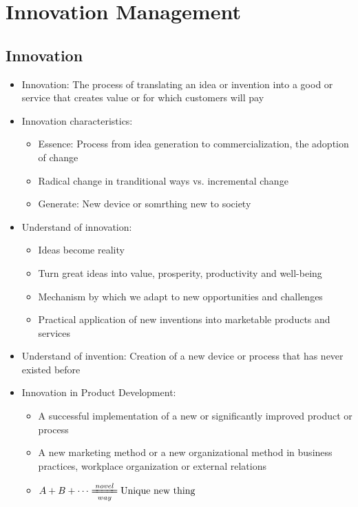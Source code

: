 \documentclass[openany,12pt,a4paper]{book}
\begin{document}
\chapter{Innovation Management}
\section{Innovation}
\begin{itemize}
    \item Innovation: The process of translating an idea or invention into a good or service that creates value or for which customers will pay
    \item Innovation characteristics:
    \begin{itemize}
        \item Essence: Process from idea generation to commercialization, the adoption of change
        \item Radical change in tranditional ways vs. incremental change
        \item Generate: New device or somrthing new to society
    \end{itemize}
    \item Understand of innovation:
    \begin{itemize}
        \item Ideas become reality
        \item Turn great ideas into value, prosperity, productivity and well-being
        \item Mechanism by which we adapt to new opportunities and challenges
        \item Practical application of new inventions into marketable products and services
    \end{itemize}
    \item Understand of invention: Creation of a new device or process that has never existed before
    \item Innovation in Product Development:
    \begin{itemize}
        \item A successful implementation of a new or significantly improved product or process
        \item A new marketing method or a new organizational method in business practices, workplace organization or external relations
        \item $A + B + \cdots \xlongequal[way]{novel} \text{Unique new thing}$
    \end{itemize}
\end{itemize}
\end{document}
